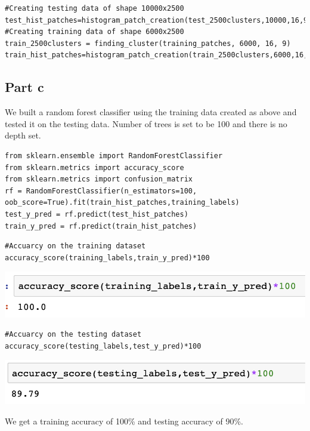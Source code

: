\documentclass{article}      %
\begin{document}
\begin{enumerate}[label=(\alph*)]
\begin{lstlisting}
#Creating testing data of shape 10000x2500
test_hist_patches=histogram_patch_creation(test_2500clusters,10000,16,9)
#Creating training data of shape 6000x2500
train_2500clusters = finding_cluster(training_patches, 6000, 16, 9)
train_hist_patches=histogram_patch_creation(train_2500clusters,6000,16,9)
\end{lstlisting}
\end{enumerate}

\subsection{Part c}

We built a random forest classifier using the training data created as above and tested it on the testing data. Number of trees is set to be 100 and there is no depth set.

\begin{lstlisting}
from sklearn.ensemble import RandomForestClassifier
from sklearn.metrics import accuracy_score
from sklearn.metrics import confusion_matrix
rf = RandomForestClassifier(n_estimators=100, oob_score=True).fit(train_hist_patches,training_labels)
test_y_pred = rf.predict(test_hist_patches)
train_y_pred = rf.predict(train_hist_patches)
\end{lstlisting}

\begin{lstlisting}
#Accuarcy on the training dataset
accuracy_score(training_labels,train_y_pred)*100
\end{lstlisting}

\includegraphics[width=\textwidth]{trainaccuracy}

\begin{lstlisting}
#Accuarcy on the testing dataset
accuracy_score(testing_labels,test_y_pred)*100
\end{lstlisting}

\includegraphics[width=\textwidth]{testaccuracy}

We get a training accuracy of 100\% and testing accuracy of 90\%.
\end{document}
